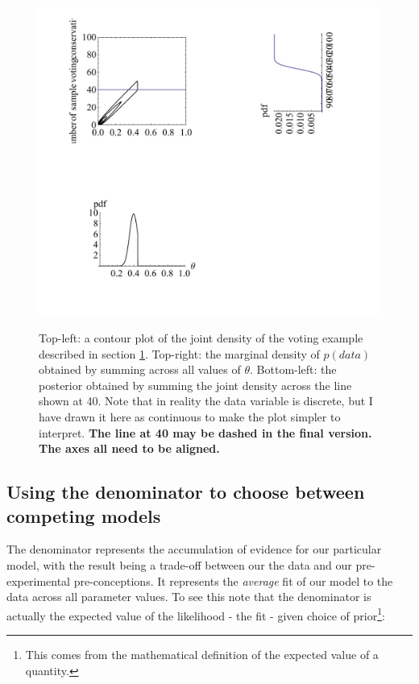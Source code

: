 \documentclass[11pt,fullpage]{book}
\begin{document}
\begin{figure}
\centering
\scalebox{0.8} 
{\includegraphics{Denominator_continuousJointDensity.pdf}}\caption{Top-left: a contour plot of the joint density of the voting example described in section \ref{fig:Denominator_continuousJointDensity}. Top-right: the marginal density of $p(data)$ obtained by summing across all values of $\theta$. Bottom-left: the posterior obtained by summing the joint density across the line shown at 40. Note that in reality the data variable is discrete, but I have drawn it here as continuous to make the plot simpler to interpret. \textbf{The line at 40 may be dashed in the final version. The axes all need to be aligned.}}\label{fig:Denominator_continuousJointDensity}
\end{figure}



\subsection{Using the denominator to choose between competing models}
The denominator represents the accumulation of evidence for our particular model, with the result being a trade-off between our the data and our pre-experimental pre-conceptions. It represents the \textit{average} fit of our model to the data across all parameter values. To see this note that the denominator is actually the expected value of the likelihood - the fit - given choice of prior\footnote{This comes from the mathematical definition of the expected value of a quantity.}:
\end{document}
